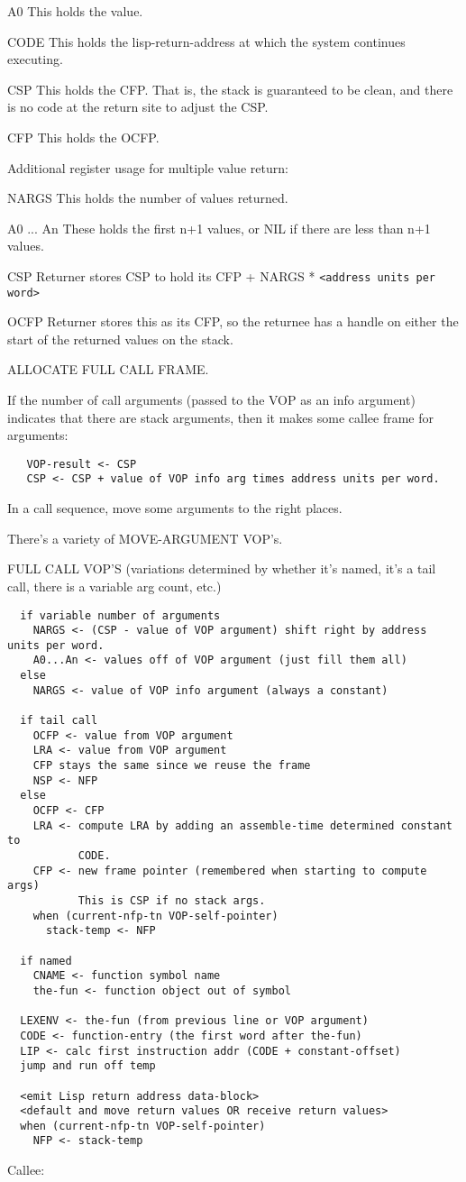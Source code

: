 A0
   This holds the value.

CODE
   This holds the lisp-return-address at which the system continues executing.

CSP
   This holds the CFP.  That is, the stack is guaranteed to be clean, and there
   is no code at the return site to adjust the CSP.

CFP
   This holds the OCFP.

Additional register usage for multiple value return:

NARGS
   This holds the number of values returned.

A0 ... An
   These holds the first n+1 values, or NIL if there are less than n+1 values.

CSP
   Returner stores CSP to hold its CFP + NARGS * \verb+<address units per word>+

OCFP
   Returner stores this as its CFP, so the returnee has a handle on either
   the start of the returned values on the stack.


ALLOCATE FULL CALL FRAME.

If the number of call arguments (passed to the VOP as an info argument)
indicates that there are stack arguments, then it makes some callee frame for
arguments:
\begin{verbatim}
   VOP-result <- CSP
   CSP <- CSP + value of VOP info arg times address units per word.
\end{verbatim}

In a call sequence, move some arguments to the right places.

There's a variety of MOVE-ARGUMENT VOP's.

FULL CALL VOP'S
(variations determined by whether it's named, it's a tail call, there
is a variable arg count, etc.)
\begin{verbatim}
  if variable number of arguments
    NARGS <- (CSP - value of VOP argument) shift right by address units per word.
    A0...An <- values off of VOP argument (just fill them all)
  else
    NARGS <- value of VOP info argument (always a constant)

  if tail call
    OCFP <- value from VOP argument
    LRA <- value from VOP argument
    CFP stays the same since we reuse the frame
    NSP <- NFP
  else
    OCFP <- CFP
    LRA <- compute LRA by adding an assemble-time determined constant to
    	   CODE.
    CFP <- new frame pointer (remembered when starting to compute args)
           This is CSP if no stack args.
    when (current-nfp-tn VOP-self-pointer)
      stack-temp <- NFP

  if named
    CNAME <- function symbol name
    the-fun <- function object out of symbol

  LEXENV <- the-fun (from previous line or VOP argument)
  CODE <- function-entry (the first word after the-fun)
  LIP <- calc first instruction addr (CODE + constant-offset)
  jump and run off temp

  <emit Lisp return address data-block>
  <default and move return values OR receive return values>
  when (current-nfp-tn VOP-self-pointer)
    NFP <- stack-temp
\end{verbatim}
Callee:

